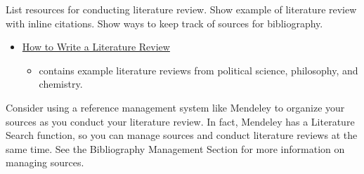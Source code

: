 \documentclass[]{book}
\providecommand{\tightlist}{%
  \setlength{\itemsep}{0pt}\setlength{\parskip}{0pt}}
\begin{document}
List resources for conducting literature review.
Show example of literature review with inline citations.
Show ways to keep track of sources for bibliography.

\begin{itemize}
\tightlist
\item
  \href{https://writing.wisc.edu/handbook/assignments/reviewofliterature/}{How to Write a Literature Review}

  \begin{itemize}
  \tightlist
  \item
    contains example literature reviews from political science, philosophy, and chemistry.
  \end{itemize}
\end{itemize}

Consider using a reference management system like Mendeley to organize your sources as you conduct your literature review. In fact, Mendeley has a Literature Search function, so you can manage sources and conduct literature reviews at the same time. See the Bibliography Management Section for more information on managing sources.
\end{document}
